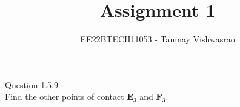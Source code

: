 \documentclass[journal,12pt,twocolumn]{IEEEtran}
\theoremstyle{remark}
\begin{document}
\let\vec\mathbf





\vspace{3cm}

\title{
Assignment 1
}
\author{ EE22BTECH11053 - Tanmay Vishwasrao%
	
}	

\maketitle

\newpage


\bigskip

\renewcommand{\thefigure}{\theenumi}
\renewcommand{\thetable}{\theenumi}
Question 1.5.9\\
Find the other points of contact $\vec{E}_3$ and $\vec{F}_3$.
\end{document}
